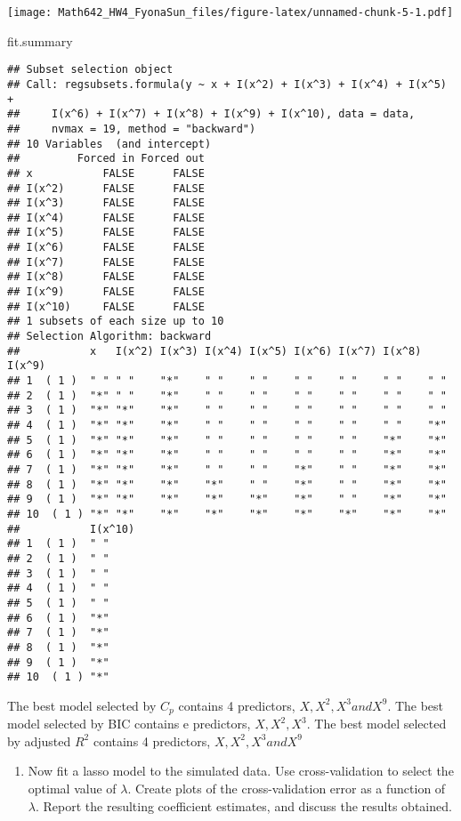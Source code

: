 \documentclass[]{article}
\newenvironment{Shaded}{\begin{snugshade}}{\end{snugshade}}
\newcommand{\NormalTok}[1]{{#1}}
\providecommand{\tightlist}{%
  \setlength{\itemsep}{0pt}\setlength{\parskip}{0pt}}
\begin{document}
\texttt{[image: Math642\_HW4\_FyonaSun\_files/figure-latex/unnamed-chunk-5-1.pdf]}

\begin{Shaded}
\begin{Highlighting}[]
\NormalTok{fit.summary}
\end{Highlighting}
\end{Shaded}

\begin{verbatim}
## Subset selection object
## Call: regsubsets.formula(y ~ x + I(x^2) + I(x^3) + I(x^4) + I(x^5) + 
##     I(x^6) + I(x^7) + I(x^8) + I(x^9) + I(x^10), data = data, 
##     nvmax = 19, method = "backward")
## 10 Variables  (and intercept)
##         Forced in Forced out
## x           FALSE      FALSE
## I(x^2)      FALSE      FALSE
## I(x^3)      FALSE      FALSE
## I(x^4)      FALSE      FALSE
## I(x^5)      FALSE      FALSE
## I(x^6)      FALSE      FALSE
## I(x^7)      FALSE      FALSE
## I(x^8)      FALSE      FALSE
## I(x^9)      FALSE      FALSE
## I(x^10)     FALSE      FALSE
## 1 subsets of each size up to 10
## Selection Algorithm: backward
##           x   I(x^2) I(x^3) I(x^4) I(x^5) I(x^6) I(x^7) I(x^8) I(x^9)
## 1  ( 1 )  " " " "    "*"    " "    " "    " "    " "    " "    " "   
## 2  ( 1 )  "*" " "    "*"    " "    " "    " "    " "    " "    " "   
## 3  ( 1 )  "*" "*"    "*"    " "    " "    " "    " "    " "    " "   
## 4  ( 1 )  "*" "*"    "*"    " "    " "    " "    " "    " "    "*"   
## 5  ( 1 )  "*" "*"    "*"    " "    " "    " "    " "    "*"    "*"   
## 6  ( 1 )  "*" "*"    "*"    " "    " "    " "    " "    "*"    "*"   
## 7  ( 1 )  "*" "*"    "*"    " "    " "    "*"    " "    "*"    "*"   
## 8  ( 1 )  "*" "*"    "*"    "*"    " "    "*"    " "    "*"    "*"   
## 9  ( 1 )  "*" "*"    "*"    "*"    "*"    "*"    " "    "*"    "*"   
## 10  ( 1 ) "*" "*"    "*"    "*"    "*"    "*"    "*"    "*"    "*"   
##           I(x^10)
## 1  ( 1 )  " "    
## 2  ( 1 )  " "    
## 3  ( 1 )  " "    
## 4  ( 1 )  " "    
## 5  ( 1 )  " "    
## 6  ( 1 )  "*"    
## 7  ( 1 )  "*"    
## 8  ( 1 )  "*"    
## 9  ( 1 )  "*"    
## 10  ( 1 ) "*"
\end{verbatim}

The best model selected by \(C_p\) contains 4 predictors,
\(X, X^2, X^3 and X^9\). The best model selected by BIC contains e
predictors, \(X, X^2, X^3\). The best model selected by adjusted \(R^2\)
contains 4 predictors, \(X, X^2, X^3 and X^9\)

\begin{enumerate}
\def\labelenumi{(\alph{enumi})}
\setcounter{enumi}{4}
\tightlist
\item
  Now fit a lasso model to the simulated data. Use cross-validation to
  select the optimal value of \(\lambda\). Create plots of the
  cross-validation error as a function of \(\lambda\). Report the
  resulting coefficient estimates, and discuss the results obtained.
\end{enumerate}
\end{document}
